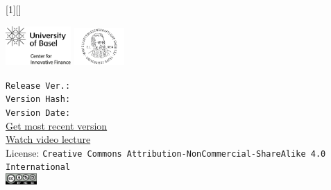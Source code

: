 [1][]
{
  \vspace{-0cm}\hfill\includegraphics[width=2.5cm]{../config/logo_cif}
  \includegraphics[width=1.9cm]{../config/seal_wwz}
  \\ \vspace{2em}
  \textbf{\inserttitle}\par
  \insertsubtitle\par  \vspace{1.5em}
  \small{}\insertauthor\par
  \insertinstitute\par \vspace{2em}
  \inserttitlegraphic
    \tiny \noindent \texttt{Release Ver.: \gitRelease}\\ 
    \texttt{Version Hash: \gitSHA}\\
    \texttt{Version Date: \gitDate}\\ \vspace{1em}
  \link \href{https://github.com/cifunibas/Bitcoin-Blockchain-Cryptoassets/blob/main/slides/intro.pdf}
  {Get most recent version}\\
  \link \href{https://github.com/cifunibas/Bitcoin-Blockchain-Cryptoassets/blob/main/slides/intro.pdf}
  {Watch video lecture}\\ \vspace{1em}
  License: \texttt{Creative Commons Attribution-NonCommercial-ShareAlike 4.0 International}\\\vspace{2em}
  \includegraphics[width = 1.2cm]{../config/license}
}


\usetikzlibrary{decorations.pathreplacing}
\usetikzlibrary{decorations.markings}
\usetikzlibrary{positioning}
\captionsetup{font=footnotesize}
